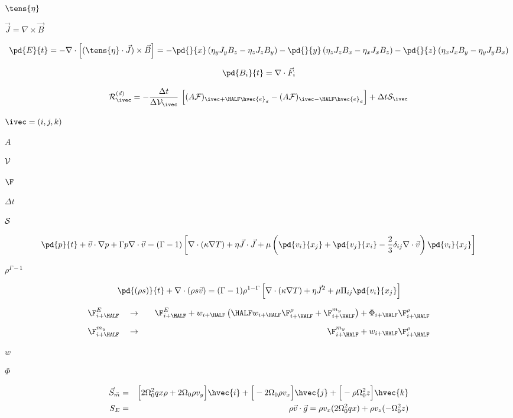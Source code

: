 \documentclass{article}
\begin{document}
$\tens{\eta}$
\pagebreak

$\vec{J} = \nabla\times\vec{B}$
\pagebreak

\[  \pd{E}{t} = -\nabla\cdot\Big[(\tens{\eta}\cdot\vec{J})\times\vec{B}\Big]
            = - \pd{}{x}\left(\eta_yJ_yB_z - \eta_zJ_zB_y\right)
              - \pd{}{y}\left(\eta_zJ_zB_x - \eta_xJ_xB_z\right)
              - \pd{}{z}\left(\eta_xJ_xB_y - \eta_yJ_yB_x\right)
\]
\pagebreak

\[   \pd{B_i}{t} = \nabla\cdot\vec{F}_i
\]
\pagebreak

\[    {\cal R}_{\ivec}^{(d)} = 
    -\frac{\Delta t}{\Delta{\cal V}_{\ivec}}\
    \Big[  (A{\cal F})_{\ivec+\HALF\hvec{e}_d} 
          -(A{\cal F})_{\ivec-\HALF\hvec{e}_d} \Big]
       + \Delta t{\cal S}_{\ivec}
\]
\pagebreak

$\ivec = (i,j,k)$
\pagebreak

$ A        $
\pagebreak

$ {\cal V} $
\pagebreak

$ \F   $
\pagebreak

$ \Delta t $
\pagebreak

$ {\cal S} $
\pagebreak

\[    \pd{p}{t} + \vec{v}\cdot\nabla p + \Gamma p \nabla\cdot\vec{v}
  = (\Gamma-1)\left[\nabla\cdot\left(\kappa\nabla T\right)
    + \eta\vec{J}\cdot\vec{J} + \mu\left(\pd{v_i}{x_j}+\pd{v_j}{x_i}
      - \frac{2}{3}\delta_{ij}\nabla\cdot\vec{v}\right)\pd{v_i}{x_j}\right]
\]
\pagebreak

$\rho^{\Gamma-1}$
\pagebreak

\[   \pd{(\rho s)}{t} + \nabla\cdot(\rho s\vec{v}) = 
   (\Gamma-1)\rho^{1-\Gamma}\left[\nabla\cdot\left(\kappa\nabla T\right)
     + \eta\vec{J}^2 + \mu \Pi_{ij}\pd{v_i}{x_j}\right]
\]
\pagebreak

\begin{eqnarray*}   \F^{E}_{i+\HALF} &\quad \to\quad&
   \F^{E}_{i+\HALF} + w_{i+\HALF}\left(\HALF w_{i+\HALF}\F^{\rho}_{i+\HALF}
    + \F^{m_y}_{i+\HALF}\right) +  \Phi_{i+\HALF}\F^{\rho}_{i+\HALF}                           
   \\ \noalign{\medskip}
   \F^{m_y}_{i+\HALF} &\quad \to\quad&
   \F^{m_y}_{i+\HALF} + w_{i+\HALF}\F^{\rho}_{i+\HALF}
\end{eqnarray*}
\pagebreak

$w$
\pagebreak

$\Phi$
\pagebreak

\begin{eqnarray*}      \vec{S}_{\vec{m}} &=&
         \Big[ 2\Omega_0^2 q x \rho + 2\Omega_0\rho v_y\Big]\hvec{i}
       + \Big[-2\Omega_0\rho v_x\Big]\hvec{j}
       + \Big[-\rho\Omega_0^2z\Big]\hvec{k} \\ 
       S_E &=& \rho \vec{v} \cdot\vec{g}
       = \rho v_x (2\Omega_0^2 qx) + \rho v_z (-\Omega_0^2 z)
\end{eqnarray*}
\pagebreak
\end{document}
